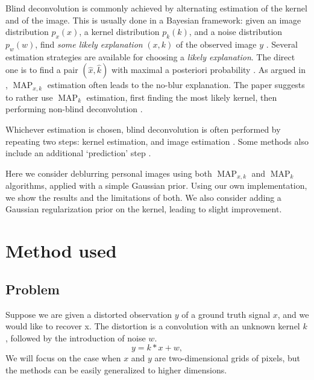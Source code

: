 \documentclass[english,a4paper]{article}
\theoremstyle{plain}
\theoremstyle{definition}
\theoremstyle{remark}
\DeclareMathOperator{\MAP}{MAP}
\begin{document}
Blind deconvolution is commonly achieved by alternating estimation of the kernel and of the image.
This is usually done in a Bayesian framework: given an image distribution $p_x(x)$, a kernel distribution $p_k(k)$, and a noise distribution $p_w(w)$, find \emph{some likely explanation} $(x,k)$ of the observed image $y$ \cite{levin2009understanding,levin2011efficient}.
Several estimation strategies are available for choosing a \emph{likely explanation}. The direct one is to find a pair $(\hat{x},\hat{k})$ with maximal a posteriori probability \cite{cho2009fast,cho2007removing,jia2007single,shan2008high,xu2010two}.
As argued in \cite{levin2011efficient,levin2009understanding}, $\MAP_{x,k}$ estimation often leads to the no-blur explanation. The paper suggests to rather use $\MAP_k$ estimation, first finding the most likely kernel, then performing non-blind deconvolution \cite{fergus2006removing,whyte2012non}.

Whichever estimation is chosen, blind deconvolution is often performed by repeating two steps: kernel estimation, and image estimation \cite{jia2007single,fergus2006removing,levin2009understanding,levin2011efficient,shan2008high}. Some methods also include an additional `prediction' step \cite{cho2009fast}.

Here we consider deblurring personal images using both $\MAP_{x,k}$ and $\MAP_k$ algorithms, applied with a simple Gaussian prior. Using our own implementation, we show the results and the limitations of both. We also consider adding a Gaussian regularization prior on the kernel, leading to slight improvement.



\section{Method used}

\subsection{Problem}
Suppose we are given a distorted observation $y$ of a ground truth signal $x$, and we would like to recover x. The distortion is a convolution with an unknown kernel $k$, followed by the introduction of noise $w$.
\begin{equation}\label{eq:convolution}
y = k*x + w ,
\end{equation}
We will focus on the case when $x$ and $y$ are two-dimensional grids of pixels, but the methods can be easily generalized to higher dimensions.
\end{document}
